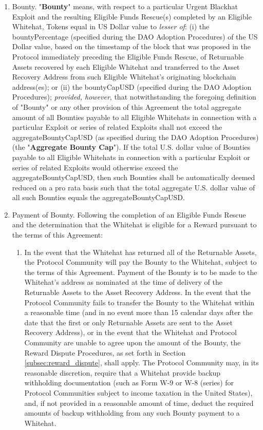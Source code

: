 \documentclass{article}
\begin{document}
\begin{enumerate}[label=\Alph*.]


    \item Bounty. "\textbf{Bounty}" means, with respect to a particular Urgent Blackhat Exploit and the resulting Eligible Funds Rescue(s) completed by an Eligible Whitehat, Tokens equal in US Dollar value to \textit{lesser of}: (i) the bountyPercentage (specified during the DAO Adoption Procedures) of the US Dollar value, based on the timestamp of the block that was proposed in the Protocol immediately preceding the Eligible Funds Rescue, of Returnable Assets recovered by each Eligible Whitehat and transferred to the Asset Recovery Address from such Eligible Whitehat's originating blockchain address(es); or (ii) the bountyCapUSD (specified during the DAO Adoption Procedures); \textit{provided, however}, that notwithstanding the foregoing definition of "Bounty" or any other provision of this Agreement the total aggregate amount of all Bounties payable to all Eligible Whitehats in connection with a particular Exploit or series of related Exploits shall not exceed the aggregateBountyCapUSD (as specified during the DAO Adoption Procedures) (the "\textbf{Aggregate Bounty Cap}"). If the total U.S. dollar value of Bounties payable to all Eligible Whitehats in connection with a particular Exploit or series of related Exploits would otherwise exceed the aggregateBountyCapUSD, then such Bounties shall be automatically deemed reduced on a pro rata basis such that the total aggregate U.S. dollar value of all such Bounties equals the aggregateBountyCapUSD.

    \item Payment of Bounty. Following the completion of an Eligible Funds Rescue and the determination that the Whitehat is eligible for a Reward pursuant to the terms of this Agreement:

          \begin{enumerate}

              \item In the event that the Whitehat has returned all of the Returnable Assets, the Protocol Community will pay the Bounty to the Whitehat, subject to the terms of this Agreement. Payment of the Bounty is to be made to the Whitehat's address as nominated at the time of delivery of the Returnable Assets to the Asset Recovery Address. In the event that the Protocol Community fails to transfer the Bounty to the Whitehat within a reasonable time (and in no event more than 15 calendar days after the date that the first or only Returnable Assets are sent to the Asset Recovery Address), or in the event that the Whitehat and Protocol Community are unable to agree upon the amount of the Bounty, the Reward Dispute Procedures, as set forth in Section \ref{subsec:reward_dispute}, shall apply. The Protocol Community may, in its reasonable discretion, require that a Whitehat provide backup withholding documentation (such as Form W-9 or W-8 (series) for Protocol Communities subject to income taxation in the United States), and, if not provided in a reasonable amount of time, deduct the required amounts of backup withholding from any such Bounty payment to a Whitehat.


\end{enumerate}
\end{enumerate}
\end{document}
